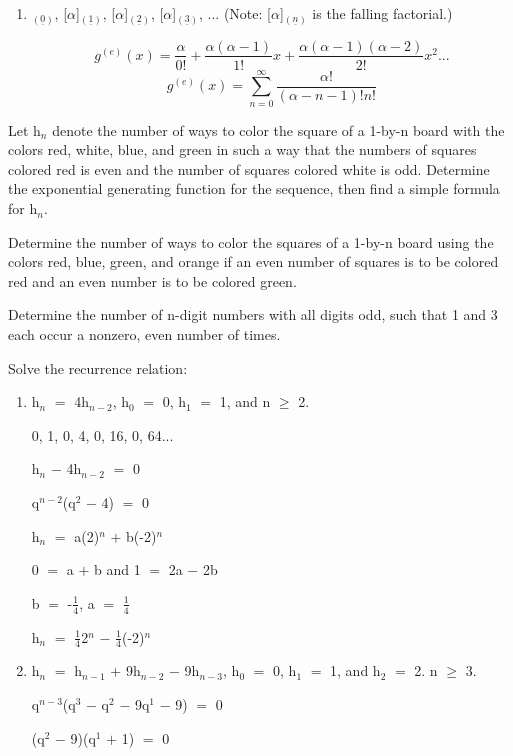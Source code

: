 \documentclass{article}
\newcommand{\mt}[1]{\ensuremath{#1}}
\newcommand{\balist}{\begin{enumerate}[label=\alph*.]}
\newcommand{\elist}{\end{enumerate}}
\newcommand{\afa}{\mt{\alpha} }
\newcommand{\ps}{\mt{+} }
\newcommand{\ms}{\mt{-} }
\newcommand{\gre}{\mt{\geq} }
\newcommand{\eql}{\mt{=} }
\newcommand{\uw}[2]{#1\mt{_{#2}}}
\newcommand{\uf}[2]{#1\mt{^{#2}}}
\newcommand{\frc}[2]{\mt{\frac{#1}{#2}}}
\newcommand{\eqn}[1]{\[#1\]}
\newcommand{\ff}[2]{[\mt{#1}]\mt{_{(\underline{#2})}}}
\begin{document}
\begin{enumerate}
   \item \ff{\alpha}{0}, \ff{\alpha}{1}, \ff{\alpha}{2}, \ff{\alpha}{3}, ... (Note: \ff{\alpha}{n} is the falling factorial.)
   
   \eqn{\uf{g}{(e)}(x) \eql \frac{\afa}{0!} + \frac{\afa(\afa - 1)}{1!}x + \frac{\alpha(\alpha - 1)(\alpha - 2)}{2!}x^2 ... }
   \eqn{\uf{g}{(e)}(x) \eql \sum_{n = 0}^{\infty} \frac{\alpha!}{(\alpha - n - 1)!n!}}
   
   
   \elist
   \item Let \uw{h}{n} denote the number of ways to color the square of a 1-by-n board with the colors red, white, blue, and green in such a way that the numbers of squares colored red is even and the number of squares colored white is odd. Determine the exponential generating function for the sequence, then find a simple formula for \uw{h}{n}.
   \item Determine the number of ways to color the squares of a 1-by-n board using the colors red, blue, green, and orange if an even number of squares is to be colored red and an even number is to be colored green.
   \item Determine the number of n-digit numbers with all digits odd, such that 1 and 3 each occur a nonzero, even number of times.
   \item Solve the recurrence relation:
   \balist
   \item \uw{h}{n} \eql 4\uw{h}{n - 2}, \uw{h}{0} \eql 0, \uw{h}{1} \eql 1, and n \gre 2.
   
   0, 1, 0, 4, 0, 16, 0, 64...
   
   \uw{h}{n} \ms 4\uw{h}{n - 2} \eql 0
   
   \uf{q}{n - 2}(\uf{q}{2} \ms 4) \eql 0
   
   \uw{h}{n} \eql a\uf{(2)}{n} \ps b\uf{(-2)}{n}
   
   0 \eql a \ps b and 1 \eql 2a \ms 2b
   
   b \eql -\frc{1}{4}, a \eql \frc{1}{4}
   
   \uw{h}{n} \eql \frc{1}{4}\uf{2}{n} \ms \frc{1}{4}\uf{(-2)}{n}
   
   \item \uw{h}{n} \eql \uw{h}{n - 1} \ps 9\uw{h}{n - 2} \ms 9\uw{h}{n - 3}, \uw{h}{0} \eql 0, \uw{h}{1} \eql 1, and \uw{h}{2} \eql 2. n \gre 3.
   
   \uf{q}{n - 3}(\uf{q}{3} \ms \uf{q}{2} \ms 9\uf{q}{1} \ms 9) \eql 0
   
   (\uf{q}{2} \ms 9)(\uf{q}{1} \ps 1) \eql 0
   

\end{enumerate}
\end{document}
